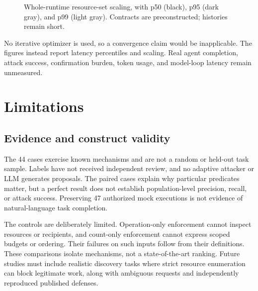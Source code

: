 \documentclass[conference,letterpaper]{IEEEtran}
\begin{document}
\begin{figure}[ht]
\centering
{}
\caption{Whole-runtime resource-set scaling, with p50 (black), p95 (dark gray), and p99 (light gray). Contracts are preconstructed; histories remain short.}
\end{figure}


No iterative optimizer is used, so a convergence claim would be inapplicable. The figures instead report latency percentiles and scaling. Real agent completion, attack success, confirmation burden, token usage, and model-loop latency remain unmeasured.


\section{Limitations}

\subsection{Evidence and construct validity}

The 44 cases exercise known mechanisms and are not a random or held-out task sample. Labels have not received independent review, and no adaptive attacker or LLM generates proposals. The paired cases explain why particular predicates matter, but a perfect result does not establish population-level precision, recall, or attack success. Preserving 47 authorized mock executions is not evidence of natural-language task completion.


The controls are deliberately limited. Operation-only enforcement cannot inspect resources or recipients, and count-only enforcement cannot express scoped budgets or ordering. Their failures on such inputs follow from their definitions. These comparisons isolate mechanisms, not a state-of-the-art ranking. Future studies must include realistic discovery tasks where strict resource enumeration can block legitimate work, along with ambiguous requests and independently reproduced published defenses.
\end{document}
